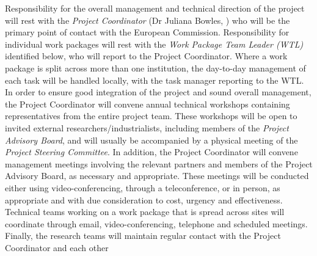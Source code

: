 \documentclass[a4paper,11pt]{article}
\begin{document}

Responsibility for the overall management and technical
direction of the project will rest with the \emph{Project Coordinator}
(Dr Juliana Bowles, \SA{}) who will be the primary point of
contact with the European Commission. Responsibility for
individual work packages will rest with the \emph{Work Package Team
Leader (WTL)} identified below, who will report to the Project Coordinator.
Where a work package is split across more than one
institution, the day-to-day management of each task will be handled
locally, with the task manager reporting to the WTL.   
%
In order to ensure good integration of the project and sound
overall management, the Project Coordinator will convene
annual technical workshops containing representatives from
the entire project team.   These workshops will be open to
invited external researchers/industrialists, including members
of the \emph{Project Advisory Board}, and will usually be
accompanied by a physical meeting of the \emph{Project Steering Committee}. In
addition, the Project Coordinator will convene management
meetings involving the relevant partners and members of the
Project Advisory Board, as necessary and appropriate. These meetings will be
conducted either using video-conferencing, through a
teleconference, or in person, as appropriate and with due consideration to
cost, urgency and effectiveness.  Technical teams
working on a work package that is spread across sites will
coordinate through email, video-conferencing, telephone and
scheduled meetings.  Finally, the research teams will maintain
regular contact with the Project Coordinator and each other
\end{document}
